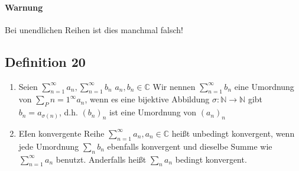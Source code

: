 \documentclass[fleqn]{scrbook}
\begin{document}
\paragraph{Warnung} Bei unendlichen Reihen ist dies manchmal falsch!

\subsection{Definition 20}
\begin{enumerate}[1)]
\item Seien $\sum_{n=1}^\infty a_n, \sum_{n=1}^\infty b_n$
$a_n, b_n \in\mathbb{C}$ Wir nennen $\sum_{n=1}^\infty b_n$ eine Umordnung von $\sum_P{n=1}^\infty a_n$, wenn es eine bijektive Abbildung $\sigma : \mathbb{N} \rightarrow \mathbb{N}$ gibt $b_n = a_{\sigma (n)}$, d.h. $(b_n)_n$ ist eine Umordnung von $(a_n)_n$\\
\item EIen konvergente Reihe $\sum_{n=1}^\infty a_n, a_n \in\mathbb{C}$ heißt unbedingt konvergent, wenn jede Umordnung $\sum_n b_n$ ebenfalls konvergent und dieselbe Summe wie $\sum_{n=1}^\infty a_n$ benutzt. Anderfalls heißt $\sum_n a_n$ bedingt konvergent.
\end{enumerate}
\end{document}
